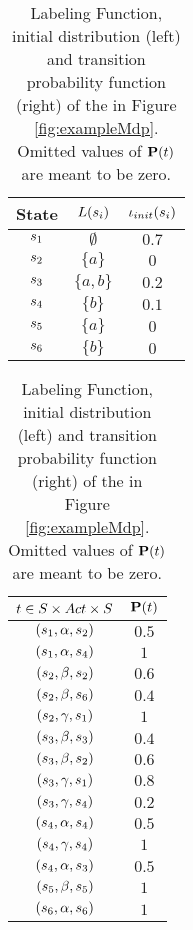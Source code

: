 \documentclass[preview]{standalone}
\begin{document}
\begin{exmp}
\begin{table}[h!]
	\parbox{.45\linewidth}{
		\begin{center}
%			
			\begin{tabular}{c|c|c} %
				State & ${L}({s}_i)$ & ${\iota_{init}}({s}_i)$\\		
				\hline
				${s}_1$ & $\emptyset$ & $0.7$\\
				${s}_2$ & $\{a\}$ & $0$\\
				${s}_3$ & $\{a,b\}$ & $0.2$\\
				${s}_4$ & $\{b\}$ & $0.1$\\
				${s}_5$ & $\{a\}$ & $0$\\
				${s}_6$ & $\{b\}$ & $0$\\			
			\end{tabular}
		\end{center}
}
\parbox{.45\linewidth}{
		\begin{center}
			\begin{tabular}{c|c} %
				$t \in {S} \times {Act} \times {S}$ & ${{\textbf{P}}}(t)$\\		
				\hline
				$({s}_1,{\alpha}, {s}_2)$ & $0.5$\\
				$({s}_1,{\alpha}, {s}_4)$ & $1$\\
				$({s}_2,{\beta}, {s}_2)$ & $0.6$\\
				$({s}_2,{\beta}, {s}_6)$ & $0.4$\\
				$({s}_2,{\gamma}, {s}_1)$ & $1$\\
				$({s}_3,{\beta}, {s}_3)$ & $0.4$\\
				$({s}_3,{\beta}, {s}_2)$ & $0.6$\\
				$({s}_3,{\gamma}, {s}_1)$ & $0.8$\\
				$({s}_3,{\gamma}, {s}_4)$ & $0.2$\\
				$({s}_4,{\alpha}, {s}_4)$ & $0.5$\\
				$({s}_4,{\gamma}, {s}_4)$ & $1$\\
				$({s}_4,{\alpha}, {s}_3)$ & $0.5$\\
				$({s}_5,{\beta}, {s}_5)$ & $1$\\
				$({s}_6,{\alpha}, {s}_6)$ & $1$\\				
			\end{tabular}
		\end{center}
	}
	\caption{Labeling Function, initial distribution (left) and transition probability function (right) of the \mdpN in Figure \ref{fig:exampleMdp}. Omitted values of ${{\textbf{P}}}(t)$ are meant to be zero.}
	\label{tab:atomicpropsandlabelingfunction}
\end{table}


\end{exmp}
\end{document}
